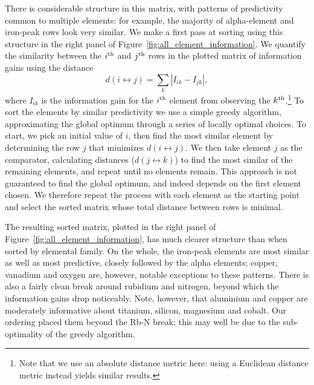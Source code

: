 \documentclass[a4paper,fleqn,usenatbib]{mnras}
\begin{document}
There is considerable structure in this matrix, with patterns of predictivity common to multiple elements: for example, the majority of alpha-element and iron-peak rows look very similar. We make a first pass at sorting using this structure in the right panel of Figure~\ref{fig:all_element_information}. We quantify the similarity between the $i^{\rm th}$ and $j^{\rm th}$ rows in the plotted matrix of information gains using the distance
\begin{equation}
d(i \leftrightarrow j) = \sum_k |I_{ik} - I_{jk}|,
\end{equation}
where $I_{ik}$ is the information gain for the $i^{\rm th}$ element from observing the $k^{\rm th}$.\footnote{Note that we use an absolute distance metric here: using a Euclidean distance metric instead yields similar results.} To sort the elements by similar predictivity we use a simple greedy algorithm, approximating the global optimum through a series of locally optimal choices. To start, we pick an initial value of $i$, then find the most similar element by determining the row $j$ that minimizes $d(i \leftrightarrow j)$. We then take element $j$ as the comparator, calculating distances ($d(j \leftrightarrow k)$) to find the most similar of the remaining elements, and repeat until no elements remain. This approach is not guaranteed to find the global optimum, and indeed depends on the first element chosen. We therefore repeat the process with each element as the starting point and select the sorted matrix whose total distance between rows is minimal.

The resulting sorted matrix, plotted in the right panel of Figure~\ref{fig:all_element_information}, has much clearer structure than when sorted by elemental family. On the whole, the iron-peak elements are most similar as well as most predictive, closely followed by the alpha elements; copper, vanadium and oxygen are, however, notable exceptions to these patterns. There is also a fairly clean break around rubidium and nitrogen, beyond which the information gains drop noticeably. Note, however, that aluminium and copper are moderately informative about titanium, silicon, magnesium and cobalt. Our ordering placed them beyond the Rb-N break; this may well be due to the sub-optimality of the greedy algorithm.
\end{document}
